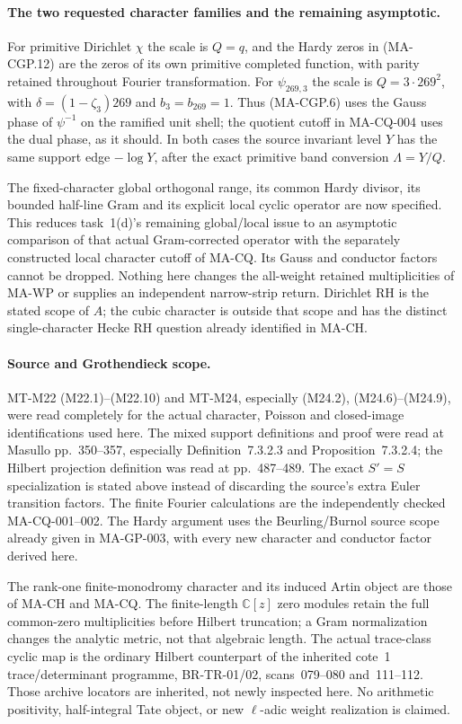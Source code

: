\paragraph{The two requested character families and the remaining asymptotic.}
For primitive Dirichlet $\chi$ the scale is $Q=q$, and the
Hardy zeros in (MA-CGP.12) are the zeros of its own primitive
completed function, with parity retained throughout Fourier
transformation.  For $\psi_{269,3}$ the scale is
$Q=3\cdot269^2$, with $\delta=(1-\zeta_3)269$ and
$b_3=b_{269}=1$.  Thus (MA-CGP.6) uses the Gauss phase of
$\psi^{-1}$ on the ramified unit shell; the quotient cutoff
in MA-CQ-004 uses the dual phase, as it should.
In both cases the source invariant level $Y$ has the same
support edge $-\log Y$, after the exact primitive band
conversion $\Lambda=Y/Q$.

The fixed-character global orthogonal range, its common Hardy
divisor, its bounded half-line Gram and its explicit local cyclic
operator are now specified.  This reduces task~1(d)'s remaining
global/local issue to an asymptotic comparison of that actual
Gram-corrected operator with the separately constructed local
character cutoff of MA-CQ.  Its Gauss and conductor factors
cannot be dropped.  Nothing here changes the all-weight
retained multiplicities of MA-WP or supplies an independent
narrow-strip return.  Dirichlet RH is the stated scope of $A$;
the cubic character is outside that scope and has the distinct
single-character Hecke RH question already identified in MA-CH.

\paragraph{Source and Grothendieck scope.}
MT-M22 (M22.1)--(M22.10) and MT-M24, especially
(M24.2), (M24.6)--(M24.9), were read completely for the actual
character, Poisson and closed-image identifications used here.
The mixed support definitions and proof were read at Masullo
pp.~350--357, especially Definition~7.3.2.3 and
Proposition~7.3.2.4; the Hilbert projection definition was
read at pp.~487--489.  The exact $S'=S$ specialization is
stated above instead of discarding the source's extra Euler
transition factors.  The finite Fourier calculations are the
independently checked MA-CQ-001--002.  The Hardy argument
uses the Beurling/Burnol source scope already given in
MA-GP-003, with every new character and conductor factor
derived here.

The rank-one finite-monodromy character and its induced Artin
object are those of MA-CH and MA-CQ.  The finite-length
$\mathbb C[z]$ zero modules retain the full common-zero
multiplicities before Hilbert truncation; a Gram normalization
changes the analytic metric, not that algebraic length.
The actual trace-class cyclic map is the ordinary Hilbert
counterpart of the inherited cote~1 trace/determinant programme,
BR-TR-01/02, scans~079--080 and~111--112.  Those archive
locators are inherited, not newly inspected here.  No
arithmetic positivity, half-integral Tate object, or new
$\ell$-adic weight realization is claimed.
